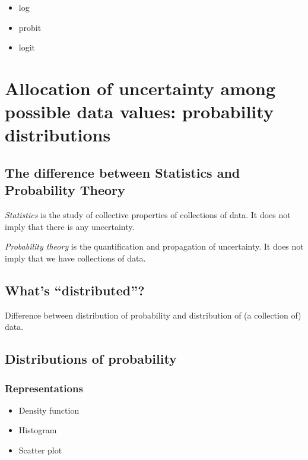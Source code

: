 \documentclass[
  a4paper,
  DIV=11,
  numbers=noendperiod,
  oneside]{scrreprt}
\begin{document}
\begin{itemize}
\item
  log
\item
  probit
\item
  logit
\end{itemize}

\hypertarget{allocation-of-uncertainty-among-possible-data-values-probability-distributions}{%
\chapter{Allocation of uncertainty among possible data values:
probability
distributions}\label{allocation-of-uncertainty-among-possible-data-values-probability-distributions}}

\hypertarget{the-difference-between-statistics-and-probability-theory}{%
\section{The difference between Statistics and Probability
Theory}\label{the-difference-between-statistics-and-probability-theory}}

\emph{Statistics} is the study of collective properties of collections
of data. It does not imply that there is any uncertainty.

\emph{Probability theory} is the quantification and propagation of
uncertainty. It does not imply that we have collections of data.

\hypertarget{whats-distributed}{%
\section{What's ``distributed''?}\label{whats-distributed}}

Difference between distribution of probability and distribution of (a
collection of) data.

\hypertarget{distributions-of-probability}{%
\section{Distributions of
probability}\label{distributions-of-probability}}

\hypertarget{representations}{%
\subsection{Representations}\label{representations}}

\begin{itemize}
\item
  Density function
\item
  Histogram
\item
  Scatter plot
\end{itemize}
\end{document}
